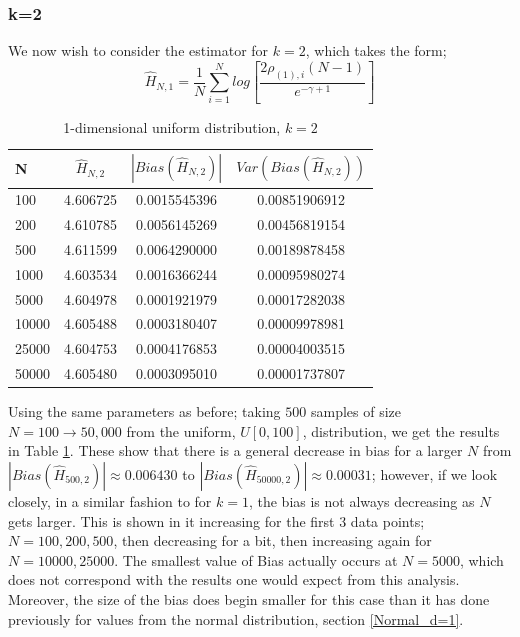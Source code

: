 \documentclass{article}
\begin{document}
\subsubsection{k=2} \label{U_k=2}
We now wish to consider the estimator for $k=2$, which takes the form;
\begin{equation} 
\hat{H}_{N, 1} = \frac{1}{N} \sum_{i=1}^{N} log \left[ \frac{2\rho_{(1),i} (N-1)}{e^{-\gamma + 1}} \right] \nonumber
\end{equation}

\begin{table}
\caption{1-dimensional uniform distribution, $k=2$} \label{uniform_k=2_table}
\begin{center}
\begin{tabular}{| l | c c c|} 
\toprule
N & $\hat{H}_{N, 2}$ & $|Bias(\hat{H}_{N, 2})|$ & $Var(Bias(\hat{H}_{N, 2}))$ \\
\midrule[1pt]
100     & 4.606725     & 0.0015545396     & 0.00851906912  \\
200     & 4.610785     & 0.0056145269     & 0.00456819154  \\
500     & 4.611599     & 0.0064290000     & 0.00189878458  \\
1000    & 4.603534     & 0.0016366244     & 0.00095980274  \\
5000    & 4.604978     & 0.0001921979     & 0.00017282038  \\
10000   & 4.605488     & 0.0003180407     & 0.00009978981  \\
25000   & 4.604753     & 0.0004176853     & 0.00004003515  \\
50000   & 4.605480     & 0.0003095010     & 0.00001737807  \\
\hline
\end{tabular}
\end{center}
\end{table}

Using the same parameters as before; taking $500$ samples of size $N=100 \to 50,000$ from the uniform, $U[0, 100]$, distribution, we get the results in Table \ref{uniform_k=2_table}. These show that there is a general decrease in bias for a larger $N$ from $|Bias(\hat{H}_{500, 2})| \approx  0.006430$ to $|Bias(\hat{H}_{50000, 2})| \approx 0.00031$; however, if we look closely, in a similar fashion to for $k=1$, the bias is not always decreasing as $N$ gets larger. This is shown in it increasing for the first 3 data points; $N=100, 200 ,500$, then decreasing for a bit, then increasing again for $N = 10000, 25000$. The smallest value of Bias actually occurs at $N=5000$, which does not correspond with the results one would expect from this analysis. Moreover, the size of the bias does begin smaller for this case than it has done previously for values from the normal distribution, section \ref{Normal_d=1}. 
\end{document}

